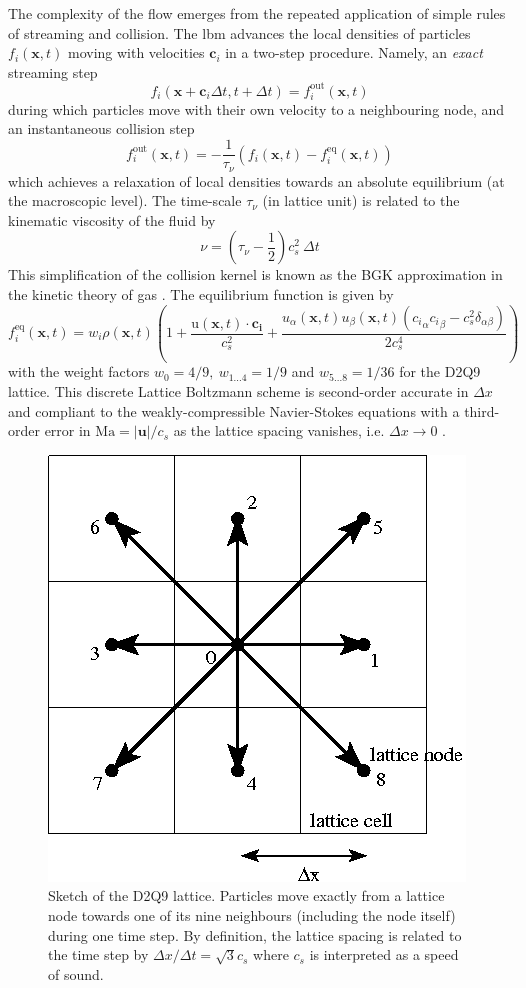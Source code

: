 \documentclass{jfm}
\newcommand{\EL}[1]{{\color{myred}{#1}}}
\begin{document}
%
The complexity of the flow emerges from the repeated application of simple rules of streaming and collision. The \ac{lbm} advances the local densities of particles $f_i(\mathbf{x},t)$ moving with velocities $\mathbf{c}_i$  in a two-step procedure. Namely, an \emph{exact} streaming step 
\[
f_i(\mathbf{x}+\mathbf{c}_i \Delta t, t + \Delta t) = f_i^{\mathrm{out}}(\mathbf{x},t)
\]
during which particles move with their own velocity to a neighbouring node, and an instantaneous collision step
\[
f_i^{\mathrm{out}}(\mathbf{x},t) = -\frac 1 {\tau_\nu} \left(f_i(\mathbf{x},t) - f_i^\mathrm{eq}(\mathbf{x},t) \right)
\]
which achieves a relaxation of local densities towards an absolute equilibrium (at the macroscopic level). The time-scale $\tau_\nu$ (in lattice unit) is related to the kinematic viscosity of the fluid by 
\[
\nu = \left( {\tau_\nu} - \frac 1 2 \right) c_s^2 ~\Delta t
\]
This simplification of the collision kernel is known as the BGK approximation in the kinetic theory of gas \EL{\citep{BGK}}.
%
The equilibrium function is given by
\[
f_i^\mathrm{eq}(\mathbf{x},t) = w_i  \rho(\mathbf{x},t) \left( 1 + \frac{\mathrm u(\mathbf{x},t) \cdot \mathbf{c_i}}{c_s^2} +
\frac{u_\alpha(\mathbf{x},t) u_\beta(\mathbf{x},t)({c_i}_\alpha {c_i}_\beta - c_s^2 \delta_{\alpha\beta})}{2 c_s^4} \right)
\] 
with the weight factors $w_0=4/9,~w_{1...4} = 1/9$ and $w_{5...8}=1/36$ for the D2Q9 lattice. 
This discrete Lattice Boltzmann scheme is second-order accurate in $\Delta x $ and compliant to the weakly-compressible Navier-Stokes equations with a third-order error in $\mathrm{Ma}=|\mathbf{u}|/c_s$ as the lattice spacing vanishes, i.e. $\Delta x \to 0$ \EL{\citep{succi_book}}. 

\begin{figure}
	\centering
	\includegraphics[width=0.3\linewidth]{D2Q9/D2Q9}
	\caption{Sketch of the D2Q9 lattice. Particles move exactly from a lattice node towards one of its nine neighbours (including the node itself) during one time step. By definition, the lattice spacing is related to the time step by $\Delta x/ \Delta t = \sqrt{3} c_s$ where $c_s$ is interpreted as a speed of sound.}
	\label{fig:D2Q9}
\end{figure}
\end{document}
